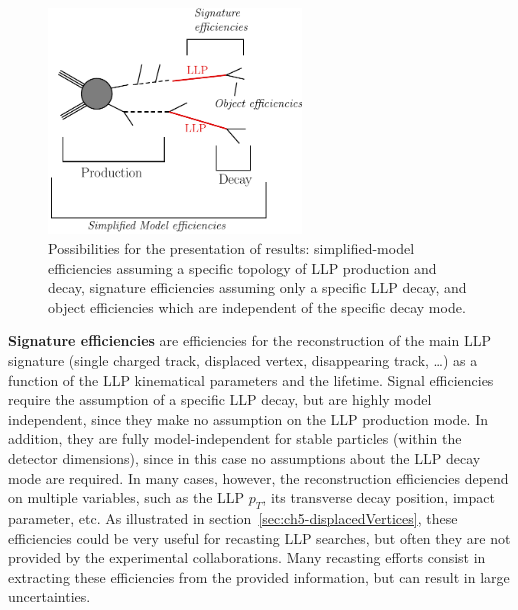 \begin{figure}[t]
\begin{center}
\includegraphics[width=0.6\textwidth,angle=0]{ch5-figures/LLPdiagramScheme.pdf}
\end{center}
\caption{Possibilities for the presentation of results: 
simplified-model efficiencies assuming a specific topology of LLP production and decay, 
signature efficiencies assuming only a specific LLP decay, and object efficiencies which are 
independent of the specific decay mode.
}
\label{fig:ch5_presentation_options}
\end{figure}


  
{\bf Signature efficiencies} are efficiencies for the reconstruction of the
main LLP signature (single charged track, displaced vertex, disappearing
track, \ldots) as a function of the LLP kinematical parameters and
the lifetime. 
Signal efficiencies require the assumption of a specific LLP decay, but 
are highly model independent, since they make no assumption on the LLP
production mode.
In addition, they are fully model-independent for stable particles
(within the detector dimensions), since in this case no assumptions about
the LLP decay mode are required.
In many cases, however, the reconstruction efficiencies depend on multiple
variables, such as the LLP $p_T$, its transverse decay position, impact
parameter, etc. 
As illustrated in section~\ref{sec:ch5-displacedVertices}, these efficiencies
could be very useful for recasting LLP searches, but often they 
are not provided by the experimental collaborations. Many recasting efforts consist in 
extracting these efficiencies from the provided information, but can result in large uncertainties. 

